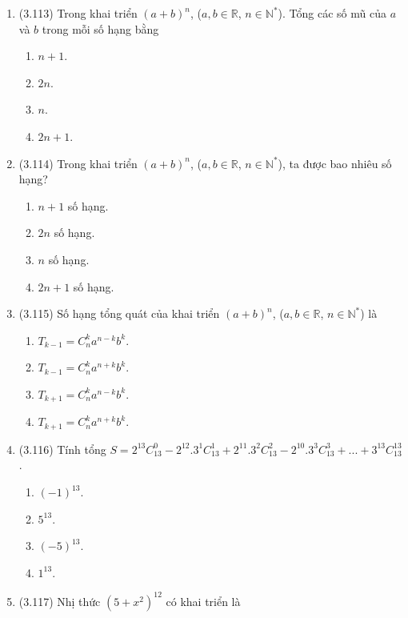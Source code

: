 \begin{enumerate}[label=\textbf{Câu \arabic*.},align=left,left=0cm..0cm,itemindent=*]
\begin{enumerate}[label=\textbf{\Alph*.},align=left,left=1cm..0cm,itemindent=*]
	\end{enumerate}
	\item (3.113) Trong khai triển $(a+b)^n$, ($a,b\in\mathbb{R}$, $n\in\mathbb{N}^{*}$). Tổng các số mũ của $a$ và $b$ trong mỗi số hạng bằng
	\begin{enumerate}[label=\textbf{\Alph*.},align=left,left=1cm..0cm,itemindent=*]
	    \item $n+1$. \item $2n$. \item $n$. \item $2n+1$.
	\end{enumerate}
	\item (3.114) Trong khai triển $(a+b)^n$, ($a,b\in\mathbb{R}$, $n\in\mathbb{N}^{*}$), ta được bao nhiêu số hạng?
	\begin{enumerate}[label=\textbf{\Alph*.},align=left,left=1cm..0cm,itemindent=*]
	    \item $n+1$ số hạng. \item $2n$ số hạng. \item $n$ số hạng. \item $2n+1$ số hạng.
	\end{enumerate}
	\item (3.115) Số hạng tổng quát của khai triển $(a+b)^n$, ($a,b\in\mathbb{R}$, $n\in\mathbb{N}^{*}$) là
	\begin{enumerate}[label=\textbf{\Alph*.},align=left,left=1cm..0cm,itemindent=*]
	    \item $T_{k-1}=C_n^ka^{n-k}b^k$. \item $T_{k-1}=C_n^ka^{n+k}b^k$. \item $T_{k+1}=C_n^ka^{n-k}b^k$. \item $T_{k+1}=C_n^ka^{n+k}b^k$.
	\end{enumerate}
	\item (3.116) Tính tổng $S=2^{13}C_{13}^0-2^{12}.3^1C_{13}^1+2^{11}.3^2C_{13}^2-2^{10}.3^3C_{13}^3+...+3^{13}C_{13}^{13}$.
	\begin{enumerate}[label=\textbf{\Alph*.},align=left,left=1cm..0cm,itemindent=*]
	    \item $(-1)^{13}$. \item $5^{13}$. \item $(-5)^{13}$. \item $1^{13}$.
	\end{enumerate}
	\item (3.117) Nhị thức $(5+x^2)^{12}$ có khai triển là
	\begin{enumerate}[label=\textbf{\Alph*.},align=left,left=1cm..0cm,itemindent=*]

\end{enumerate}
\end{enumerate}
